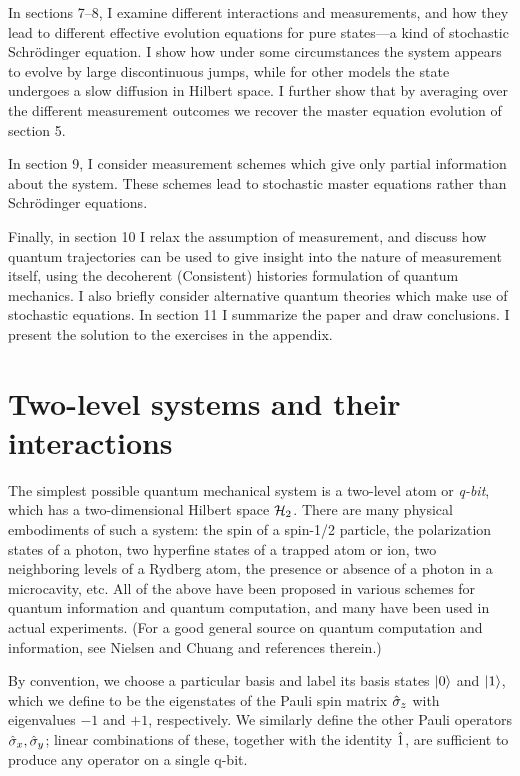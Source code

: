 In sections 7--8, I examine different interactions and measurements,
and how they lead to different effective evolution equations for pure
states---a kind of stochastic Schr\"odinger equation.
I show how under some circumstances the system appears to evolve by
large discontinuous jumps, while for other models the state undergoes
a slow diffusion in Hilbert space.  I further show that by averaging over
the different measurement outcomes we recover the master equation evolution
of section 5.

In section 9, I consider measurement schemes which give only partial
information about the system.  These schemes lead to stochastic master
equations rather than Schr\"odinger equations.

Finally, in section 10 I relax the assumption of measurement, and discuss
how quantum trajectories can be used to give insight into the nature of
measurement itself, using the decoherent (Consistent) histories formulation
of quantum mechanics.  I also briefly consider alternative quantum theories
which make use of stochastic equations.  In section 11 I summarize the paper
and draw conclusions.  I present the solution to the exercises in the
appendix.

\section{Two-level systems and their interactions}

The simplest possible quantum mechanical system is a two-level atom or
{\it q-bit}, which has a two-dimensional Hilbert space ${\cal H}_2$.
There are many physical embodiments of such a system:  the spin of a
spin-1/2 particle, the polarization states of a photon, two hyperfine
states of a trapped atom or ion, two neighboring levels of a Rydberg atom,
the presence or absence of a photon in a microcavity, etc.  All of the
above have been proposed in various schemes for quantum information and
quantum computation, and many have been used in actual
experiments.  (For a good general source on quantum computation and
information, see Nielsen and Chuang \cite{NielsenChuang} and
references therein.)

By convention, we choose a particular basis and label its basis states
${| 0 \rangle}$ and ${| 1 \rangle}$, which we define to be the eigenstates of the Pauli
spin matrix ${\hat\sigma_z}$ with eigenvalues $-1$ and $+1$, respectively.
We similarly define the other Pauli operators ${\hat\sigma_x},{\hat\sigma_y}$; linear combinations
of these, together with the identity ${\hat 1}$, are sufficient to produce any
operator on a single q-bit.

